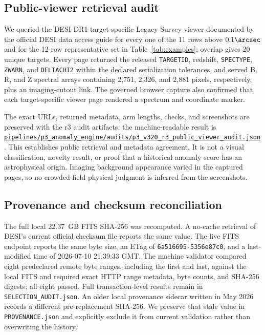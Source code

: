 \documentclass[twocolumn,linenumbers]{aastex702}
\newcommand{\repoBase}{https://github.com/Hubify-Projects/bigbounce/blob/main}
\newcommand{\artifact}[1]{\href{\repoBase/#1}{\nolinkurl{#1}}}
\begin{document}
\subsection{Public-viewer retrieval audit}\label{sec:viewer-audit}

We queried the DESI DR1 target-specific Legacy Survey viewer documented by the official DESI data
access guide for every one of the 11 rows above $0.1\arcsec$ and for the 12-row representative set
in Table~\ref{tab:examples}; overlap gives 20 unique targets.  Every page returned the released
\texttt{TARGETID}, redshift, \texttt{SPECTYPE}, \texttt{ZWARN}, and \texttt{DELTACHI2} within the
declared serialization tolerances, and served B, R, and Z spectral arrays containing 2,751,
2,326, and 2,881 pixels, respectively, plus an imaging-cutout link.  The governed browser capture
also confirmed that each target-specific viewer page rendered a spectrum and coordinate marker.

The exact URLs, returned metadata, arm lengths, checks, and screenshots are preserved with the r3
audit artifacts; the machine-readable result is
\artifact{pipelines/p3\_anomaly\_engine/audits/p3\_v320\_r3\_public\_viewer\_audit.json}.
This establishes public retrieval and metadata agreement.  It is not a visual classification,
novelty result, or proof that a historical anomaly score has an astrophysical origin.  Imaging
background appearance varied in the captured pages, so no crowded-field physical judgment is
inferred from the screenshots.

\subsection{Provenance and checksum reconciliation}\label{sec:checksums}

The full local 22.37~GB FITS SHA-256 was recomputed.  A no-cache retrieval of DESI's current
official checksum file reports the same value.  The live FITS endpoint reports the same byte size,
an ETag of \texttt{6a516695-5356e87c0}, and a last-modified time of 2026-07-10 21:39:33 GMT.  The
machine validator compared eight predeclared remote byte ranges, including the first and last,
against the local FITS and required exact HTTP range metadata, byte counts, and SHA-256 digests;
all eight passed.  Full transaction-level results remain in \texttt{SELECTION\_AUDIT.json}.  An older
local provenance sidecar written in May 2026 records a
different pre-replacement SHA-256.  We preserve that stale value in \texttt{PROVENANCE.json} and
explicitly exclude it from current validation rather than overwriting the history.
\end{document}

